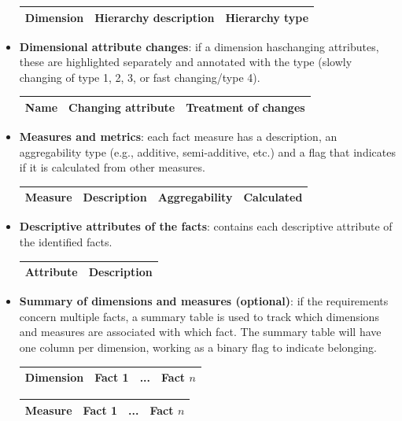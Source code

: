 \begin{itemize}
\begin{table}[H]
    \centering
    \begin{tabular}{|c|c|c|}
        \hline
        Dimension & Hierarchy description & Hierarchy type \\
        \hline
    \end{tabular}
    \end{table}
    \item \textbf{Dimensional attribute changes}: if a dimension haschanging attributes, these are highlighted separately and annotated with the type (slowly changing of type 1, 2, 3, or fast changing/type 4).
    \begin{table}[H]
    \centering
    \begin{tabular}{|c|c|c|}
        \hline
        Name & Changing attribute & Treatment of changes \\
        \hline
    \end{tabular}
    \end{table}
    \item \textbf{Measures and metrics}: each fact measure has a description, an aggregability type (e.g., additive, semi-additive, etc.) and a flag that indicates if it is calculated from other measures.
    \begin{table}[H]
    \centering
    \begin{tabular}{|c|c|c|c|}
        \hline
        Measure & Description & Aggregability & Calculated \\
        \hline
    \end{tabular}
    \end{table}
    \item \textbf{Descriptive attributes of the facts}: contains each descriptive attribute of the identified facts.
    \begin{table}[H]
    \centering
    \begin{tabular}{|c|c|}
        \hline
        Attribute & Description \\
        \hline
    \end{tabular}
    \end{table}
    \item \textbf{Summary of dimensions and measures (optional)}: if the requirements concern multiple facts, a summary table is used to track which dimensions and measures are associated with which fact. The summary table will have one column per dimension, working as a binary flag to indicate belonging.
    \begin{table}[H]
    \centering
    \begin{tabular}{|c|c|c|c|}
        \hline
        Dimension & Fact 1 & ... & Fact $n$ \\
        \hline
    \end{tabular}
    \hfill
    \begin{tabular}{|c|c|c|c|}
        \hline
        Measure & Fact 1 & ... & Fact $n$ \\
        \hline
    \end{tabular}
    \end{table}
\end{itemize}

